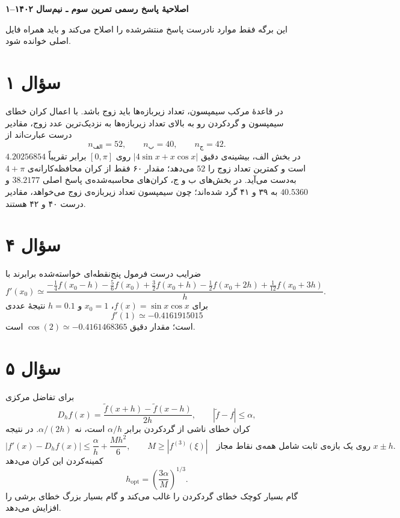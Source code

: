 \documentclass[12pt]{article}
\begin{document}
\begin{center}
  {\Large\textbf{اصلاحیهٔ پاسخ رسمی تمرین سوم ـ نیم‌سال ۱۴۰۲--۱}}
\end{center}

این برگه فقط موارد نادرست پاسخ منتشرشده را اصلاح می‌کند و باید همراه فایل اصلی خوانده شود.

\section*{سؤال ۱}
در قاعدهٔ مرکب سیمپسون، تعداد زیربازه‌ها باید زوج باشد. با اعمال کران خطای سیمپسون و گردکردن رو به بالای تعداد زیربازه‌ها به نزدیک‌ترین عدد زوج، مقادیر درست عبارت‌اند از
\[
  n_{\text{الف}}=52,\qquad
  n_{\text{ب}}=40,\qquad
  n_{\text{ج}}=42.
\]
در بخش الف، بیشینه‌ی دقیق
\(\lvert4\sin x+x\cos x\rvert\)
روی
\([0,\pi]\)
برابر تقریباً
\(4.20256854\)
است و کمترین تعداد زوج را
\(52\)
می‌دهد؛ مقدار ۶۰ فقط از کران محافظه‌کارانه‌ی
\(4+\pi\)
به‌دست می‌آید. در بخش‌های ب و ج، کران‌های محاسبه‌شده‌ی پاسخ اصلی
\(38.2177\)
و
\(40.5360\)
به ۳۹ و ۴۱ گرد شده‌اند؛ چون سیمپسون تعداد زیربازه‌ی زوج می‌خواهد، مقادیر درست ۴۰ و ۴۲ هستند.

\section*{سؤال ۴}
ضرایب درست فرمول پنج‌نقطه‌ای خواسته‌شده برابرند با
\[
 f'(x_0)\simeq
 \frac{
 -\frac14 f(x_0-h)
 -\frac56 f(x_0)
 +\frac32 f(x_0+h)
 -\frac12 f(x_0+2h)
 +\frac1{12}f(x_0+3h)}
 {h}.
\]
برای \(f(x)=\sin x\cos x\)، \(x_0=1\) و \(h=0.1\) نتیجهٔ عددی
\[
  f'(1)\simeq-0.4161915015
\]
است؛ مقدار دقیق \(\cos(2)\simeq-0.4161468365\) است.

\section*{سؤال ۵}
برای تفاضل مرکزی
\[
  D_hf(x)=\frac{\widetilde f(x+h)-\widetilde f(x-h)}{2h},
\qquad
 |\widetilde f-f|\leq\alpha,
\]
کران خطای ناشی از گردکردن برابر \(\alpha/h\) است، نه \(\alpha/(2h)\). در نتیجه
\[
  |f'(x)-D_hf(x)|
  \leq \frac{\alpha}{h}+\frac{M h^2}{6},
  \qquad
  M\geq |f^{(3)}(\xi)|
  \quad\text{روی یک بازه‌ی ثابت شامل همه‌ی نقاط مجاز }x\pm h.
\]
کمینه‌کردن این کران می‌دهد
\[
  h_{\mathrm{opt}}=\left(\frac{3\alpha}{M}\right)^{1/3}.
\]
گام بسیار کوچک خطای گردکردن را غالب می‌کند و گام بسیار بزرگ خطای برشی را افزایش می‌دهد.
\end{document}
